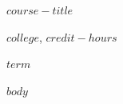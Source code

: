 \documentclass[11pt]{article}
\begin{document}
\begin{center}
  {\Large\bfseries\sffamily $course-title$}\par
  \vspace{0.5em}
  \textbf{$college$}, $credit-hours$\par
  \vspace{0.5em}
  {\large $term$}\par
\end{center}

\vspace{0.5\baselineskip}

$body$
\end{document}
